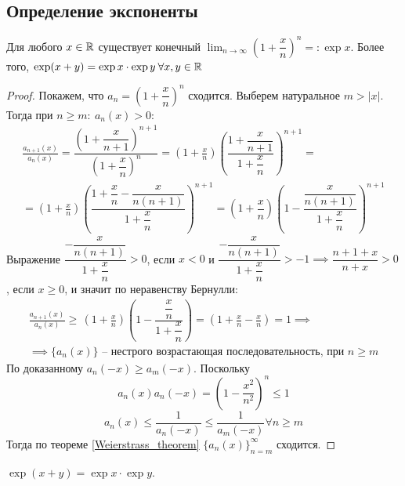 \subsection{Определение экспоненты}
\begin{theorem}
    Для любого $ x \in \mathbb{R} $ существует конечный $ \lim_{n \to \infty}\left(1 + \dfrac{x}{n}\right)^n = : \exp x $.
    Более того, $ \exp(x + y) = \exp x \cdot \exp y \: \forall x, y \in \mathbb{R} $
\end{theorem} \begin{proof}
    Покажем, что $ a_n = \left(1 + \dfrac{x}{n}\right)^ n $ сходится. Выберем натуральное $ m > |x| $. Тогда при $ n \geq  m:\: a_n(x) > 0 $: \begin{multline}
        \frac{a_{n + 1}(x)}{a_n(x)} = \dfrac{\left(1 + \dfrac{x}{n + 1}\right)^{n + 1}}{\left(1 + \dfrac{x}{n}\right)^n} = \left(1 + \frac{x}{n}\right)\left(\dfrac{1 + \dfrac{x}{n + 1}}{1 + \dfrac{x}{n}}\right)^{n + 1} =\\=\left(1 + \frac{x}{n}\right)\left(\dfrac{1 + \dfrac{x}{n} - \dfrac{x}{n(n + 1)}}{1 + \dfrac{x}{n}}\right)^{n + 1} = \left(1 + \dfrac{x}{n}\right)\left(1 - \dfrac{\dfrac{x}{n(n + 1)}}{1 + \dfrac{x}{n}}\right)^{n + 1}
    \end{multline}
    Выражение $ \dfrac{ - \dfrac{x}{n(n + 1)}}{1 + \dfrac{x}{n}} > 0$, если $ x < 0$ и $ \dfrac{ - \dfrac{x}{n(n + 1)}}{1 + \dfrac{x}{n}}> - 1 \implies  \dfrac{n + 1 + x}{n + x} > 0 $, если $ x \geq 0 $, и значит по неравенству Бернулли: \begin{multline}
        \frac{a_{n + 1}(x)}{a_n(x)} \geq\, \left(1 + \frac{x}{n}\right)\left(1 - \dfrac{\dfrac{x}{n}}{1 + \dfrac{x}{n}}\right) = \left(1 + \frac{x}{n} - \frac{x}{n}\right) = 1 \implies\\ \implies  \{a_n(x)\} \text{ -- нестрого возрастающая последовательность, при } n \geq m 
    \end{multline}
    По доказанному $ a_n( - x) \geq  a_m( - x) $. Поскольку \begin{equation}
        a_n(x)a_n( - x) = \left(1 - \frac{x^2}{n^2}\right)^n \leq 1
    \end{equation}
    \begin{equation}
    a_n(x) \leq \frac{1}{a_n( - x)} \leq \frac{1}{a_m( - x)} \forall n \geq m
   \end{equation}
   Тогда по теореме \ref{Weierstrass_theorem} $ \{a_n(x)\}_{n = m}^ \infty $ сходится.
\end{proof} \begin{proposition}
     $ \exp(x + y) = \exp x \cdot \exp y $.

\end{proposition}
